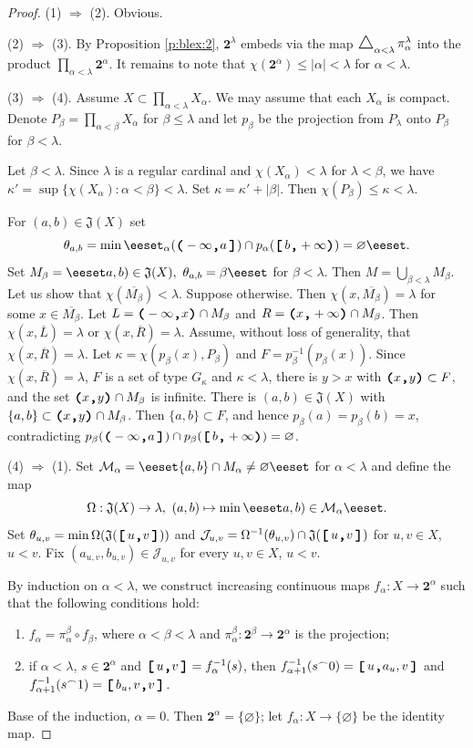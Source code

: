 \documentclass[preprint]{elsarticle}
\def\Om{\Omega}
\def\be{\beta}
\def\al{\alpha}
\def\la{\lambda}
\def\ka{\kappa}
\def\cl#1{\overline{#1}}
\def\es{\varnothing}
\def\sset#1{\{#1\}}
\def\set#1{\bbset#1\eeset}
\def\bbset#1:#2\eeset{\{#1\,:\,#2\}}
\def\cM{{\mathcal M}}
\def\diag{\mathop{\bigtriangleup}}
\def\fun{{}^\frown}
\def\te{\theta}
\theoremstyle{definition}
\theoremstyle{remark}
\def\rarr{\Rightarrow}
\def\DD{\operatornamewithlimits{%
  \mathchoice{\vcenter{\hbox{\huge \Delta}}}
             {\vcenter{\hbox{\Large \Delta}}}
             {\mathrm{\Delta}}
             {\mathrm{\Delta}}}}
\def\DD{\operatornamewithlimits{\mbox{\hbox{\huge \Delta}}}}
\def\DD{\operatornamewithlimits{\Delta}}
\def\DD{\operatornamewithlimits{%
  \mathchoice{\vcenter{\hbox{\huge $\Delta$}}}
             {\vcenter{\hbox{\Large $\Delta$}}}
             {\mathrm{\Delta}}
             {\mathrm{\Delta}}}}
\def\DD{\operatornamewithlimits{%
  \mathchoice{\vcenter{\hbox{\huge $\bigtriangleup$}}}
             {\vcenter{\hbox{\Large $\bigtriangleup$}}}
             {\mathrm{\bigtriangleup}}
             {\mathrm{\bigtriangleup}}}}
\def\diag{\DD}
\def\lex#1#2{\mathfrak{L}(#2^{#1})}
\def\lex#1#2{#2^{#1}}
\def\B{2}
\def\B{\mathsf{2}}
\def\B{\mathbf{2}}
\def\cJ{{\mathcal J}}
\def\ilcomma/{\boldsymbol{,}}
\def\ilsymlp{\boldsymbol{(}}
\def\ilsymrp{\boldsymbol{)}}
\def\ilsymlc{\boldsymbol{[}}
\def\ilsymrc{\boldsymbol{]}}
\def\ilfont#1{\boldsymbol{#1}}
\def\ilfontX#1{\mathrm{\text{\texttt{\textbf{\large #1}}}}}
\def\ilfontX#1{{\text{\texttt{\textbf{\large \upshape #1}}}}}
\def\ilfont#1{\raisebox{-1.2pt}{\ilfontX{#1}}}
\def\ilfontC#1{\raisebox{-0.7pt}{\ilfontX{#1}}}
\def\ilcomma/{\ilfontC{,}}
\def\ilsymlp{\ilfont{(}}
\def\ilsymrp{\ilfont{)}}
\def\ilsymlc{\ilfont{[}\,}
\def\ilsymrc{\,\ilfont{]}}
\def\ilpp(#1,#2){\ilsymlp#1\ilcomma/ #2\ilsymrp}
\def\ilcp[#1,#2){\ilsymlc#1\ilcomma/ #2\ilsymrp}
\def\ilpc(#1,#2]{\ilsymlp#1\ilcomma/ #2\ilsymrc}
\def\ilcc[#1,#2]{\ilsymlc#1\ilcomma/ #2\ilsymrc}
\def\jumps#1{\mathfrak{J}(#1)}
\def\lexab{\lex\la\B}
\begin{document}
\begin{proof}
(1) $\rarr$ (2). Obvious.

(2) $\rarr$ (3). By Proposition \ref{p:blex:2}, $\lexab$ embeds via the map $\diag_{\al<\la} \pi_\al^\la$ into the product $\prod_{\al<\la} \lex\al\B$. It remains to note that $\chi(\lex\al\B)\leq |\al|<\la$ for $\al<\la$.

(3) $\rarr$ (4). Assume $X\subset \prod_{\al<\la}X_\al$. We may assume that each $X_\al$ is compact. Denote $P_\be = \prod_{\al<\be}X_\al$ for $\be\leq\la$ and let $p_\be$ be the projection from $P_\la$ onto $P_\be$ for $\be<\la$.

Let $\be<\la$. Since $\la$ is a regular cardinal and $\chi(X_\al)<\la$ for $\la<\be$, we have $\ka'=\sup\{ \chi(X_\al) : \al < \be \}<\la$. Set $\ka=\ka' + |\be|$. Then $\chi(P_\be)\leq\ka<\la$.

For $(a,b)\in\jumps X$ set
\[
\te_{a,b}=\min \set{\al<\la: p_\al(\ilpc(-\infty,a]) \cap  p_\al(\ilcp[b,+\infty))=\es}.
\]
Set $M_\be=\set{a,b : (a,b)\in\jumps X,\ \te_{a,b}=\be}$ for $\be<\la$. Then $M=\bigcup_{\be<\la} M_\be$. Let us show that $\chi(\cl{M_\be})<\la$. Suppose otherwise. Then $\chi(x,\cl{M_\be})=\la$ for some $x\in \cl{M_\be}$. Let $L=\ilpp(-\infty,x)\cap M_\be$ and $R=\ilpp(x,+\infty)\cap M_\be$. Then $\chi(x,\cl{L})=\la$ or $\chi(x,\cl{R})=\la$. Assume, without loss of generality, that $\chi(x,\cl{R})=\la$. Let $\ka=\chi(p_\be(x), P_\be)$ and $F=p_\be^{-1}(p_\be(x))$. Since $\chi(x,\cl{R})=\la$, $F$ is a set of type $G_\ka$ and $\ka<\la$, there is $y>x$ with $\ilpp(x,y)\subset F$, and the set $\ilpp(x,y)\cap M_\be$ is infinite. There is $(a,b)\in\jumps X$ with $\sset{a,b}\subset \ilpp(x,y)\cap M_\be$. Then $\sset{a,b}\subset F$, and hence $p_\be(a)=p_\be(b)=x$, contradicting $p_\be(\ilpc(-\infty,a]) \cap  p_\be(\ilcp[b,+\infty))=\es$.

(4) $\rarr$ (1). Set $\cM_\al=\set{(a,b)\in \jumps X: \sset{a,b}\cap M_\al\neq\es}$ for $\al<\la$ and define the map
\[
\Om: \jumps X \to \la,\ (a,b) \mapsto \min\set{\al<\la: (a,b)\in \cM_\al}.
\]
Set $\te_{u,v}=\min  \Om(\jumps{\ilcc[u,v]})$ and $\cJ_{u,v}=\Om^{-1}(\te_{u,v})\cap \jumps{\ilcc[u,v]}$ for $u,v\in X$, $u<v$. Fix $(a_{u,v},b_{u,v})\in \cJ_{u,v}$ for every $u,v\in X$, $u<v$.

By induction on $\al<\la$, we construct increasing continuous maps $f_\al: X\to \B^\al$ such that the following conditions hold:
\begin{enumerate}
\item
$f_\al=\pi_\al^\be\circ f_\be$, where $\al<\be<\la$ and $\pi_\al^\be: \B^\be\to \B^\al$ is the projection;
\item
if $\al<\la$, 
$s\in \B^\al$ and $\ilcc[u,v]=f^{-1}_\al(s)$, then $f^{-1}_{\al+1}(s\fun 0)=\ilcc[u,a_{u,v}]$ and $f^{-1}_{\al+1}(s\fun 1)=\ilcc[b_{u,v},v]$.
\end{enumerate}
Base of the induction, $\al=0$. Then $\B^\al=\sset\es$; let $f_\al: X\to \sset\es$ be the identity map.


\end{proof}
\end{document}
